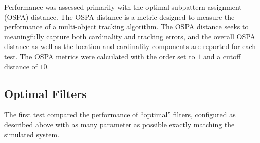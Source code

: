 \documentclass{article}
\begin{document}
Performance was assessed primarily with the optimal subpattern assignment (OSPA)\cite{OSPA} distance. The OSPA distance is a metric designed to measure the performance of a multi-object tracking algorithm. The OSPA distance seeks to meaningfully capture both cardinality and tracking errors, and the overall OSPA distance as well as the location and cardinality components are reported for each test. The OSPA metrics were calculated with the order set to $1$ and  a cutoff distance of $10$.

\subsection{Optimal Filters}
The first test compared the performance of ``optimal'' filters, configured as described above with as many parameter as possible exactly matching the simulated system.
\end{document}
